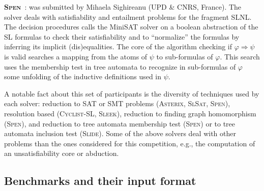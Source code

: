 \documentclass[twoside,11pt]{article}
\newcommand{\limp}{\Rightarrow}
\newcommand{\SLRD}{\textsc{SLID}}
\newcommand{\SLNL}{\textsc{SLNL}}
\newcommand{\ASTERIX}{\textsc{Asterix}}
\newcommand{\CYCLIST}{\textsc{Cyclist-SL}}
\newcommand{\SLEEK}{\textsc{Sleek}}
\newcommand{\SLIDE}{\textsc{Slide}}
\newcommand{\SLSAT}{\textsc{SlSat}}
\newcommand{\SPEN}{\textsc{Spen}}
\begin{document}
\medskip
\noindent
\textbf{\SPEN}~\cite{EneaLSV14,SPENsite}:
was submitted by 
Mihaela Sighireanu (UPD \& CNRS, France).
The solver deals with satisfiability and entailment problems for the fragment \SLNL.
The decision procedures calls the MiniSAT solver on a boolean abstraction of the SL formulas to check their satisfiability and to ``normalize'' the formulas by inferring its implicit (dis)equalities. %
The core of the algorithm checking if $\varphi\limp\psi$ is valid searches a mapping from the atoms of $\psi$ to sub-formulas of $\varphi$.
This search uses the membership test in tree automata to recognize in sub-formulas of $\varphi$ some unfolding of the inductive definitions used in $\psi$.


\medskip
A notable fact about this set of participants is the diversity of techniques used by each solver:
reduction to SAT or SMT problems (\ASTERIX, \SLSAT, \SPEN),
resolution based (\CYCLIST, \SLEEK),
reduction to finding graph homomorphism (\SPEN), and
reduction to tree automata membership test (\SPEN) or to tree automata inclusion test (\SLIDE).
%
Some of the above solvers deal with other problems than the ones considered for this competition, e.g., the computation of an unsatisfiability core or abduction.


\subsection{Benchmarks and their input format}
\end{document}
